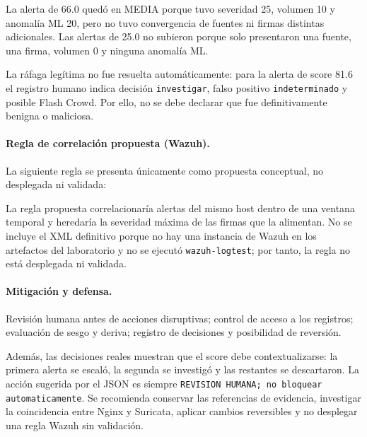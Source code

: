 La alerta de 66.0 quedó en MEDIA porque tuvo severidad 25, volumen 10 y anomalía ML 20, pero no tuvo convergencia de fuentes ni firmas distintas adicionales. Las alertas de 25.0 no subieron porque solo presentaron una fuente, una firma, volumen 0 y ninguna anomalía ML.

La ráfaga legítima no fue resuelta automáticamente: para la alerta de score 81.6 el registro humano indica decisión \texttt{investigar}, falso positivo \texttt{indeterminado} y posible Flash Crowd. Por ello, no se debe declarar que fue definitivamente benigna o maliciosa.

\paragraph{Regla de correlación propuesta (Wazuh).}
La siguiente regla se presenta únicamente como propuesta conceptual, no desplegada ni validada:

La regla propuesta correlacionaría alertas del mismo host dentro de una ventana temporal y heredaría la severidad máxima de las firmas que la alimentan. No se incluye el XML definitivo porque no hay una instancia de Wazuh en los artefactos del laboratorio y no se ejecutó \texttt{wazuh-logtest}; por tanto, la regla no está desplegada ni validada.

\paragraph{Mitigación y defensa.}
Revisión humana antes de acciones disruptivas; control de acceso a los registros; evaluación de sesgo y deriva; registro de decisiones y posibilidad de reversión.

Además, las decisiones reales muestran que el score debe contextualizarse: la primera alerta se escaló, la segunda se investigó y las restantes se descartaron. La acción sugerida por el JSON es siempre \texttt{REVISION HUMANA; no bloquear automaticamente}. Se recomienda conservar las referencias de evidencia, investigar la coincidencia entre Nginx y Suricata, aplicar cambios reversibles y no desplegar una regla Wazuh sin validación.

